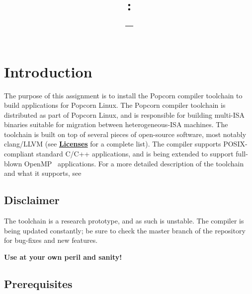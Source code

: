 \documentclass{article}
\title{
\vspace{2in}
\textmd{\textbf{\hmwkClass:\\ \hmwkNumber -- \hmwkTitle}}\\
\vspace{3in}
}
\begin{document}
\maketitle



\newpage
\tableofcontents
\newpage


\section{Introduction}

The purpose of this assignment is to install the Popcorn compiler toolchain to build applications for Popcorn Linux.  The Popcorn compiler toolchain is distributed as part of Popcorn Linux, and is responsible for building multi-ISA binaries suitable for migration between heterogeneous-ISA machines.  The toolchain is built on top of several pieces of open-source software, most notably clang/LLVM (see \hyperref[s:licenses]{\textbf{Licenses}} for a complete list).  The compiler supports POSIX-compliant standard C/C++ applications, and is being extended to support full-blown OpenMP~\cite{openmp} applications.  For a more detailed description of the toolchain and what it supports, see~\cite{lyerly2016popcorn,Barbalace:2017:BBH:3037697.3037738}

\subsection{Disclaimer}

The toolchain is a research prototype, and as such is unstable.  The compiler is being updated constantly; be sure to check the master branch of the repository for bug-fixes and new features.

\textbf{Use at your own peril and sanity!}

\subsection{Prerequisites}
\end{document}
